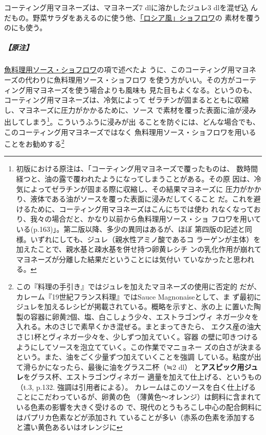 \begin{recette}
コーティング用マヨネーズは、マヨネーズ7 dlに溶かしたジュレ3 dlを混ぜ込
んだもの。野菜サラダをあえるのに使う他、\protect\hyperlink{}{「ロシア風」ショフロワ}の
素材を覆うのにも使う。

\hypertarget{ux539fux6ce8-3}{%
\subparagraph{【原注】}\label{ux539fux6ce8-3}}

\protect\hyperlink{sauce-chaud-froid-maigre}{魚料理用ソース・ショフロワ}の項で述べたよ
うに、このコーティング用マヨネーズの代わりに魚料理用ソース・ショフロワ
を使う方がいい。その方がコーティング用マヨネーズを使う場合よりも風味も
見た目もよくなる。というのも、コーティング用マヨネーズは、冷気によって
ゼラチンが固まるとともに収縮し、マヨネーズに圧力がかかるために、ソース
で素材を覆った表面に油が浸み出してしまう\footnote{初版における原注は、「コーティング用マヨネーズで覆ったものは、
  数時間経つと、油の露で覆われたようになってしまうことがある。その原
  因は、冷気によってゼラチンが固まる際に収縮し、その結果マヨネーズに
  圧力がかかり、液体である油がソースを覆った表面に浸みだしてくること
  だ。これを避けるために、コーティング用マヨネーズはこんにちでは使わ
  れなくなっており、我々の場合だと、かなり以前から魚料理用ソース・ショ
  フロワを用いている(p.163)」。第二版以降、多少の異同はあるが、ほぼ
  第四版の記述と同様。いずれにしても、ジュレ（親水性アミノ酸であるコ
  ラーゲンが主体）を加えたことで、親水基と疎水基を併せ持つ卵黄レシチ
  ンの乳化作用が崩れてマヨネーズが分離した結果だということには気付い
  ていなかったと思われる。}。こういうふうに浸みが出
ることを防ぐには、どんな場合でも、このコーティング用マヨネーズではなく
魚料理用ソース・ショフロワを用いることをお勧めする\footnote{この『料理の手引き』ではジュレを加えたマヨネーズの使用に否定的
  だが、カレーム『19世紀フランス料理』ではSauce Magnonaiseとして、ま
  ず最初にジュレを加えるレシピが掲載されている。概略を示すと、氷の上
  に置いた陶製の容器に卵黄2個、塩、白こしょう少々、エストラゴンヴィ
  ネガー少々を入れる。木のさじで素早くかき混ぜる。まとまってきたら、
  エクス産の油大さじ1杯とヴィネガー少々を、少しずつ加えていく。容器
  の壁に叩きつけるようにしてソースを泡立てていく。この作業でマニョネー
  ズの白さが決まるという。また、油をごく少量ずつ加えていくことを強調
  している。粘度が出て滑らかになったら、最後に油をグラス二杯（≒2 dl）
  と\textbf{アスピック用ジュレ}をグラス\undemi{}杯、エストラゴンヴィネガー
  適量を加えて仕上げる、というもの（t.3, p.132. 強調は引用者による）。
  カレームはこのソースを白く仕上げることにこだわっているが、卵黄の色
  （薄黄色〜オレンジ）は飼料に含まれている色素の影響を大きく受けるの
  で、現代のとうもろこし中心の配合飼料にはパプリカ色素などが添加され
  ていることが多い（赤系の色素を添加すると濃い黄色あるいはオレンジに
}
\end{recette}
